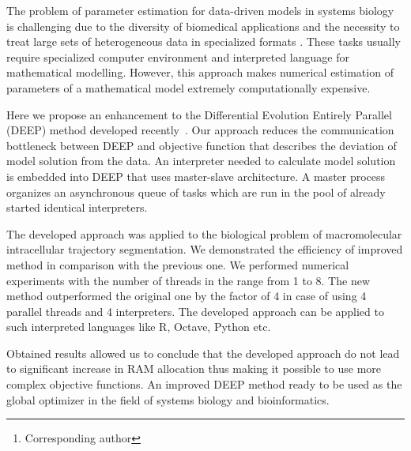 \documentclass[12pt, a4paper]{article} %
\begin{document}

\renewcommand{\abstractname}{\large \textbf{\uppercase{
    Deep: optimizer with embedded interpreter\\
}}}
\begin{abstract}
    \normalsize %
    \bigskip %
    \noindent A.~V.~Svichkarev\footnote[*]{Corresponding author}, K.~N.~Kozlov \\
    \noindent
    System biology and bioinformatics lab, IAMM,
    Peter the Great St.Petersburg Polytechnic University,
St.Petersburg, Russia \\
    \noindent e-mail: tolik0393@bionet.nsc.ru \\
\end{abstract}

The problem of parameter estimation
for data-driven models in systems biology
is challenging due to the diversity
of biomedical applications and
the necessity to treat large sets of
heterogeneous data in specialized formats \cite{mendes1998non}.
These tasks usually require
specialized computer environment
and interpreted language for
mathematical modelling.
However, this approach makes
numerical estimation of parameters
of a mathematical model extremely
computationally expensive.

Here we propose
an enhancement to the
Differential Evolution Entirely Parallel (DEEP) method
developed recently~\cite{Kozlov11}.
Our approach reduces the
communication bottleneck
between DEEP and objective function
that describes the deviation
of model solution
from the data.
An interpreter needed to
calculate model solution
is embedded into
DEEP that uses
master-slave architecture.
A master process
organizes an asynchronous queue
of tasks which are run
in the pool of
already started identical interpreters.

The developed approach was
applied to the biological problem
of macromolecular intracellular
trajectory segmentation.
We demonstrated the efficiency
of improved method
in comparison with the previous one.
We performed numerical experiments
with the number of threads
in the range from 1 to 8.
The new method outperformed
the original one by the
factor of 4
in case of using 4
parallel threads and 4
interpreters.
The developed approach can be applied to
such interpreted languages like
R, Octave, Python etc.

Obtained results allowed us
to conclude that
the developed approach
do not lead to significant increase
in RAM allocation thus making
it possible to use
more complex objective functions.
An improved DEEP method ready
to be used as the global optimizer
in the field of systems biology
and bioinformatics.

\vfill %
\end{document}
